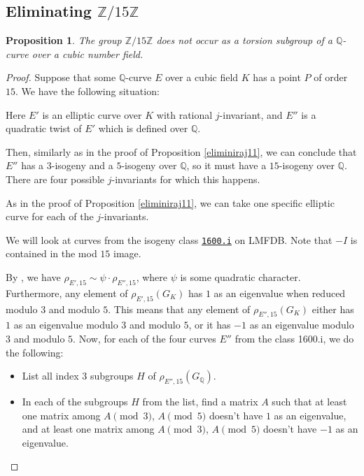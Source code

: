 \documentclass[10pt,leqno]{amsart}
\newcommand{\lmfdb}[1]{%
  \href{https://www.lmfdb.org/EllipticCurve/Q/#1}{\texttt{#1}}%
}
\newcommand{\Z}{\mathbb{Z}}
\newcommand{\Q}{\mathbb{Q}}
\newtheorem{proposition}[theorem]{Proposition}
\theoremstyle{definition}
\theoremstyle{remark}
\numberwithin{theorem}{section}
\begin{document}
 

\subsection{Eliminating $\Z/15\Z$} \begin{proposition}\label{eliminiraj15}
    The group $\Z/15\Z$ does not occur as a torsion subgroup of a $\Q$-curve over a cubic number field.
\end{proposition}
\begin{proof}
Suppose that some $\Q$-curve $E$ over a cubic field $K$ has a point $P$ of order $15$.
We have the following situation: 
\begin{center}
\end{center}
Here $E'$ is an elliptic curve over $K$ with rational $j$-invariant, and $E''$ is a quadratic twist of $E'$ which is defined over $\Q$. 

Then, similarly as in the proof of Proposition \ref{eliminiraj11}, we can conclude that $E''$ has a $3$-isogeny and a $5$-isogeny over $\Q$, so it must have a $15$-isogeny over $\Q$. There are four possible $j$-invariants for which this happens.

As in the proof of Proposition \ref{eliminiraj11}, we can take one specific elliptic curve for each of the $j$-invariants.

We will look at curves from the isogeny class \lmfdb{1600.i} on LMFDB. Note that $-I$ is contained in the mod $15$ image.

By , we have $\rho_{E', 15} \sim \psi \cdot \rho_{E'', 15}$, where $\psi$ is some quadratic character. Furthermore, any element of $\rho_{E', 15}(G_K)$ has $1$ as an eigenvalue when reduced modulo $3$ and modulo $5$. This means that any element of $\rho_{E'', 15}(G_K)$ either has $1$ as an eigenvalue modulo $3$ and modulo $5$, or it has $-1$ as an eigenvalue modulo $3$ and modulo $5$. Now, for each of the four curves $E''$ from the class 1600.i, we do the following:

\begin{itemize}
    \item List all index $3$ subgroups $H$ of $\rho_{E'', 15}(G_\Q)$.
    \item In each of the subgroups $H$ from the list, find a matrix $A$ such that at least one matrix among $A \pmod 3$,  $A \pmod 5$ doesn't have $1$ as an eigenvalue, and at least one matrix among $A \pmod 3$, $A \pmod 5$ doesn't have $-1$ as an eigenvalue. 
\end{itemize}


\end{proof}
\end{document}
